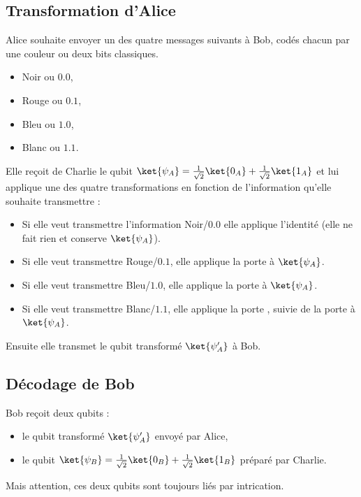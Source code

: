\documentclass[11pt,class=report,crop=false]{standalone}
\begin{document}
\subsection{Transformation d'Alice}

Alice souhaite envoyer un des quatre messages suivants à Bob, codés chacun par une couleur ou deux bits classiques.
\begin{itemize}
  \item \og{}Noir\fg{} ou $0.0$,
  \item \og{}Rouge\fg{} ou $0.1$,  
  \item \og{}Bleu\fg{} ou $1.0$,
  \item \og{}Blanc\fg{} ou $1.1$.
\end{itemize}

Elle reçoit de Charlie le qubit $\ket{\psi_A} = \frac1{\sqrt2} \ket{0_A} + \frac1{\sqrt2} \ket{1_A}$
et lui applique une des quatre transformations en fonction de l'information qu'elle souhaite transmettre :
\begin{itemize}
  \item Si elle veut transmettre l'information \og{}Noir/$0.0$\fg{} elle applique l'identité  (elle ne fait rien et conserve $\ket{\psi_A}$).
  \item Si elle veut transmettre \og{}Rouge/$0.1$\fg{}, elle applique la porte  à $\ket{\psi_A}$.
  \item Si elle veut transmettre \og{}Bleu/$1.0$\fg{}, elle applique la porte  à $\ket{\psi_A}$.
  \item Si elle veut transmettre \og{}Blanc/$1.1$\fg{}, elle applique la porte , suivie de la porte   à $\ket{\psi_A}$.
\end{itemize}

Ensuite elle transmet le qubit transformé $\ket{\psi'_A}$ à Bob.





\subsection{Décodage de Bob}

Bob reçoit deux qubits :
\begin{itemize}
  \item le qubit transformé $\ket{\psi'_A}$ envoyé par Alice,
  \item le qubit $\ket{\psi_B} = \frac1{\sqrt2} \ket{0_B} + \frac1{\sqrt2} \ket{1_B}$ préparé par Charlie.
\end{itemize}
Mais attention, ces deux qubits sont toujours liés par intrication.
\end{document}
